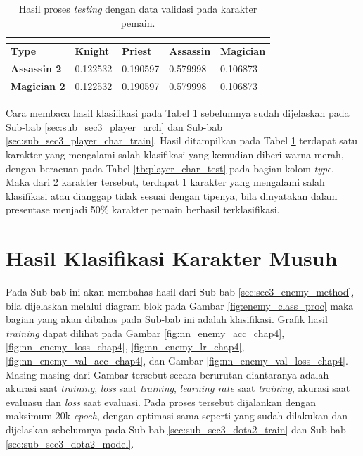 \begin{longtable}{|l|l|l|l|l|}
	\caption{Hasil proses \textit{testing} dengan data validasi pada karakter pemain.}
	\vspace{1ex}
	\label{tb:player_valid_result}\\
	\hline
	\rowcolor[HTML]{C0C0C0} 
	\textbf{Type} & \textbf{Knight} & \textbf{Priest} & \textbf{Assassin} & \textbf{Magician} \\ \hline
	\textbf{Assassin 2} & 0.122532 & 0.190597 & {\color[HTML]{009901} 0.579998} & 0.106873 \\ \hline
	\textbf{Magician 2} & 0.122532 & 0.190597 & {\color[HTML]{FE0000} 0.579998} & 0.106873 \\ \hline
\end{longtable}
\vspace{1ex}

Cara membaca hasil klasifikasi pada Tabel \ref{tb:player_valid_result} sebelumnya sudah dijelaskan pada Sub-bab \ref{sec:sub_sec3_player_arch} dan Sub-bab \ref{sec:sub_sec3_player_char_train}. Hasil ditampilkan pada Tabel \ref{tb:player_valid_result} terdapat satu karakter yang mengalami salah klasifikasi yang kemudian diberi warna merah, dengan beracuan pada Tabel \ref{tb:player_char_test} pada bagian kolom \textit{type}. Maka dari 2 karakter tersebut, terdapat 1 karakter yang mengalami salah klasifikasi atau dianggap tidak sesuai dengan tipenya, bila dinyatakan dalam presentase menjadi 50\% karakter pemain berhasil terklasifikasi.
\vspace{1ex}

\section{Hasil Klasifikasi Karakter Musuh}
\label{sec:sec4_eval_enemy}
\vspace{1ex}

Pada Sub-bab ini akan membahas hasil dari Sub-bab \ref{sec:sec3_enemy_method}, bila dijelaskan melalui diagram blok pada Gambar \ref{fig:enemy_class_proc} maka bagian yang akan dibahas pada Sub-bab ini adalah klasifikasi. Grafik hasil \textit{training} dapat dilihat pada Gambar \ref{fig:nn_enemy_acc_chap4}, \ref{fig:nn_enemy_loss_chap4}, \ref{fig:nn_enemy_lr_chap4}, \ref{fig:nn_enemy_val_acc_chap4}, dan Gambar \ref{fig:nn_enemy_val_loss_chap4}. Masing-masing dari Gambar tersebut secara berurutan diantaranya adalah akurasi saat \textit{training}, \textit{loss} saat \textit{training}, \textit{learning rate} saat \textit{training}, akurasi saat evaluasu dan \textit{loss} saat evaluasi. Pada proses tersebut dijalankan dengan maksimum 20k \textit{epoch}, dengan optimasi sama seperti yang sudah dilakukan dan dijelaskan sebelumnya pada Sub-bab \ref{sec:sub_sec3_dota2_train} dan Sub-bab \ref{sec:sub_sec3_dota2_model}.
\vspace{1ex}

